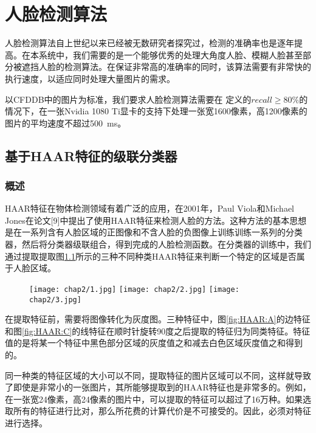 \chapter{人脸检测算法}
\label{chap:facedetection}

人脸检测算法自上世纪以来已经被无数研究者探究过，检测的准确率也是逐年提高。在本系统中，我们需要的是一个能够优秀的处理大角度人脸、模糊人脸甚至部分被遮挡人脸的检测算法。在保证非常高的准确率的同时，该算法需要有非常快的执行速度，以适应同时处理大量图片的需求。



以CFDDB中的图片为标准，我们要求人脸检测算法需要在 定义的$recall\geq 80\%$的情况下，在一张Nvidia 1080 Ti显卡的支持下处理一张宽1600像素，高1200像素的图片的平均速度不超过\SI{500}{ms}。


\section{基于HAAR特征的级联分类器}

\subsection{概述}
HAAR特征在物体检测领域有着广泛的应用，在2001年，Paul Viola和Michael Jones在论文[9]中提出了使用HAAR特征来检测人脸的方法。这种方法的基本思想是在一系列含有人脸区域的正图像和不含人脸的负图像上训练训练一系列的分类器，然后将分类器级联组合，得到完成的人脸检测函数。在分类器的训练中，我们通过提取提取图\ref{fig:HAAR}所示的三种不同种类HAAR特征来判断一个特定的区域是否属于人脸区域。

\begin{figure}[!htp]
	\centering
	{\texttt{[image: chap2/1.jpg]}}
	\hspace{4em}
	{\texttt{[image: chap2/2.jpg]}}
	\hspace{4em}
	{\texttt{[image: chap2/3.jpg]}}
	\label{fig:HAAR}
\end{figure}

在提取特征前，需要将图像转化为灰度图。三种特征中，图\ref{fig:HAAR:A}的边特征和图\ref{fig:HAAR:C}的线特征在顺时针旋转90度之后提取的特征归为同类特征。特征值的是将某一个特征中黑色部分区域的灰度值之和减去白色区域灰度值之和得到的。

同一种类的特征区域的大小可以不同，提取特征的图片区域可以不同，这样就导致了即使是非常小的一张图片，其所能够提取到的HAAR特征也是非常多的。例如，在一张宽24像素，高24像素的图片中，可以提取的特征可以超过了16万种。如果选取所有的特征进行比对，那么所花费的计算代价是不可接受的。因此，必须对特征进行选择。

